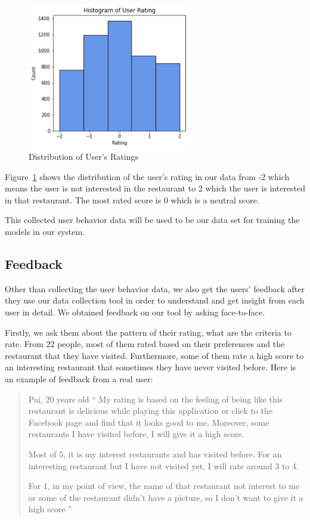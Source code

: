 \documentclass[12pt,oneside,openright,a4paper]{cpe-english-project}
\begin{document}
\begin{figure}[H]\centering
\includegraphics[width=200pt]{./images/4DistributionofUsersRatings.png}
\caption{Distribution of User’s Ratings}\label{fig:4DistributionofUsersRatings}
\end{figure}

Figure~\ref{fig:4DistributionofUsersRatings} shows the distribution of the user’s rating in our data from -2 which means the user is not interested in the restaurant to 2 which the user is interested in that restaurant. The most rated score is 0 which is a neutral score.

This collected user behavior data will be used to be our data set for training the models in our system.


\subsection{Feedback}

Other than collecting the user behavior data, we also get the users’ feedback after they use our data collection tool in order to understand and get insight from each user in detail. We obtained feedback on our tool by asking face-to-face.

Firstly, we ask them about the pattern of their rating, what are the criteria to rate. From 22 people, most of them rated based on their preferences and the restaurant that they have visited. Furthermore, some of them rate a high score to an interesting restaurant that sometimes they have never visited before. Here is an example of feedback from a real user:

\begin{quote}{Pai, 20 years old}
“ My rating is based on the feeling of being like this restaurant is delicious while playing this application or click to the Facebook page and find that it looks good to me. Moreover, some restaurants I have visited before, I will give it a high score.

Most of 5, it is my interest restaurants and has visited before. For an interesting restaurant but I have not visited yet, I will rate around 3 to 4.

For 1, in my point of view, the name of that restaurant not interest to me or some of the restaurant didn’t have a picture, so I don’t want to give it a high score ”
\end{quote}
\end{document}
